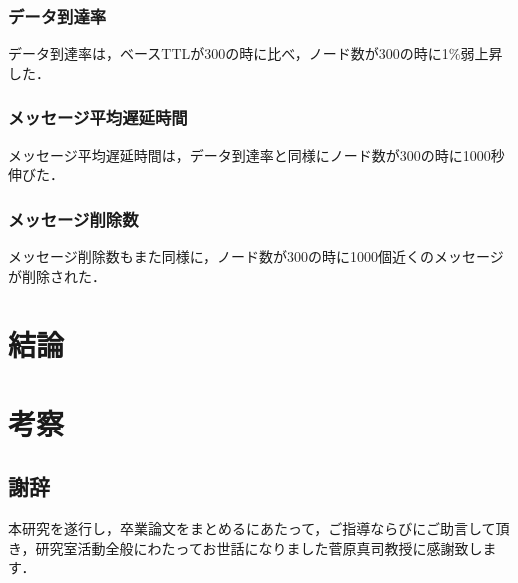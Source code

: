 \documentclass[11pt]{icsthesis}
\begin{document}
\subsection{データ到達率}
データ到達率は，ベースTTLが300の時に比べ，ノード数が300の時に1\%弱上昇した．
\subsection{メッセージ平均遅延時間}
メッセージ平均遅延時間は，データ到達率と同様にノード数が300の時に1000秒伸びた．
\subsection{メッセージ削除数}
メッセージ削除数もまた同様に，ノード数が300の時に1000個近くのメッセージが削除された．

\chapter{結論}

\chapter{考察}



\clearpage
\fancyhead[L]{}\fancyhead[R]{}
\renewcommand{\headrulewidth}{0truemm}
\section*{謝辞}
本研究を遂行し，卒業論文をまとめるにあたって，ご指導ならびにご助言して頂き，研究室活動全般にわたってお世話になりました菅原真司教授に感謝致します．

\clearpage
\nocite{*}

\fancyhead[L]{\nouppercase{\small\leftmark}}\fancyhead[R]{}
\renewcommand{\headrulewidth}{0.3truemm}


\clearpage
\fancyhead[L]{\nouppercase{\small\leftmark}}
\fancyhead[R]{\nouppercase{\small\rightmark}}
\fancyfoot[C]{--\ \thepage\ --}
\renewcommand{\headrulewidth}{0.3truemm}
\appendix
\end{document}
